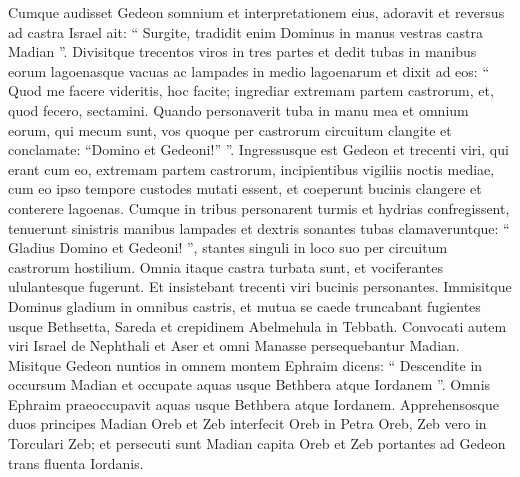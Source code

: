 \begin{biblechapter}
\begin{biblechapter}
\begin{biblechapter}
\begin{biblechapter}
\begin{biblechapter}
\begin{biblechapter}
\begin{biblechapter}
 \verse Cumque audisset Gedeon somnium et interpretationem eius, adoravit et reversus ad castra Israel ait: “ Surgite, tradidit enim Dominus in manus vestras castra Madian ”. 
\verse Divisitque trecentos viros in tres partes et dedit tubas in manibus eorum lagoenasque vacuas ac lampades in medio lagoenarum 
\verse et dixit ad eos: “ Quod me facere videritis, hoc facite; ingrediar extremam partem castrorum, et, quod fecero, sectamini. 
\verse Quando personaverit tuba in manu mea et omnium eorum, qui mecum sunt, vos quoque per castrorum circuitum clangite et conclamate: “Domino et Gedeoni!” ”.
 \verse Ingressusque est Gedeon et trecenti viri, qui erant cum eo, extremam partem castrorum, incipientibus vigiliis noctis mediae, cum eo ipso tempore custodes mutati essent, et coeperunt bucinis clangere et conterere lagoenas. 
\verse Cumque in tribus personarent turmis et hydrias confregissent, tenuerunt sinistris manibus lampades et dextris sonantes tubas clamaveruntque: “ Gladius Domino et Gedeoni! ”, 
\verse stantes singuli in loco suo per circuitum castrorum hostilium. Omnia itaque castra turbata sunt, et vociferantes ululantesque fugerunt. 
\verse Et insistebant trecenti viri bucinis personantes. Immisitque Dominus gladium in omnibus castris, et mutua se caede truncabant fugientes usque Bethsetta, Sareda et crepidinem Abelmehula in Tebbath.
 \verse Convocati autem viri Israel de Nephthali et Aser et omni Manasse persequebantur Madian. 
\verse Misitque Gedeon nuntios in omnem montem Ephraim dicens: “ Descendite in occursum Madian et occupate aquas usque Bethbera atque Iordanem ”. Omnis Ephraim praeoccupavit aquas usque Bethbera atque Iordanem. 
\verse Apprehensosque duos principes Madian Oreb et Zeb interfecit Oreb in Petra Oreb, Zeb vero in Torculari Zeb; et persecuti sunt Madian capita Oreb et Zeb portantes ad Gedeon trans fluenta Iordanis.
 

\end{biblechapter}
\end{biblechapter}
\end{biblechapter}
\end{biblechapter}
\end{biblechapter}
\end{biblechapter}
\end{biblechapter}
